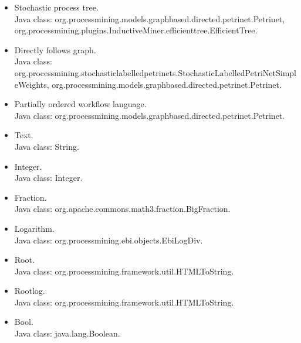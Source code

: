 {\begin{itemize}
\item Stochastic process tree.\\Java class: org.processmining.models.graphbased.directed.petrinet.Petrinet, org.processmining.plugins.InductiveMiner.efficienttree.EfficientTree.
\item Directly follows graph.\\Java class: org.processmining.stochasticlabelledpetrinets.StochasticLabelledPetriNetSimpleWeights, org.processmining.models.graphbased.directed.petrinet.Petrinet.
\item Partially ordered workflow language.\\Java class: org.processmining.models.graphbased.directed.petrinet.Petrinet.
\item Text.\\Java class: String.
\item Integer.\\Java class: Integer.
\item Fraction.\\Java class: org.apache.commons.math3.fraction.BigFraction.
\item Logarithm.\\Java class: org.processmining.ebi.objects.EbiLogDiv.
\item Root.\\Java class: org.processmining.framework.util.HTMLToString.
\item Rootlog.\\Java class: org.processmining.framework.util.HTMLToString.
\item Bool.\\Java class: java.lang.Boolean.
\end{itemize}}
